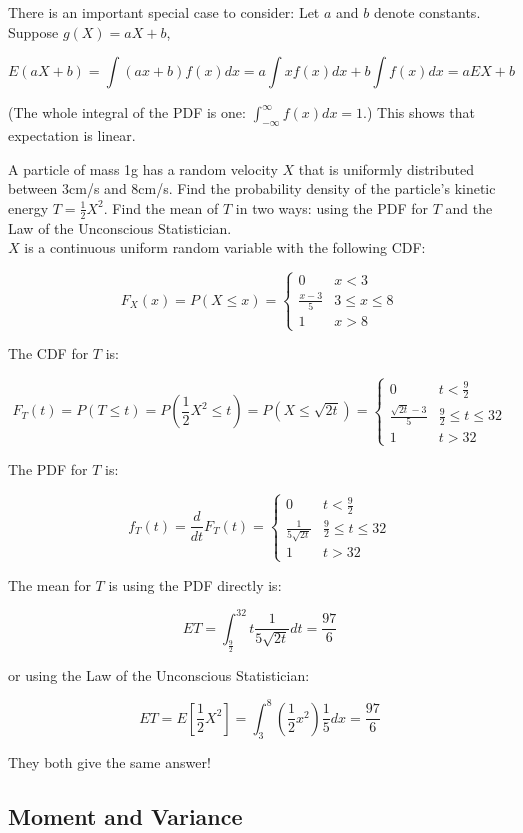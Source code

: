 \documentclass[12pt, a4paper]{article}
\newcounter{exa}
\begin{document}
There is an important special case to consider: Let $a$ and $b$ denote constants. Suppose $g(X)=aX+b$,

\[ E(aX+b)=\int (ax+b)f(x)dx=a\int xf(x)dx+b\int f(x) dx = aEX+b \]

(The whole integral of the PDF is one: $\int_{-\infty}^\infty f(x) dx=1$.) This shows that expectation is linear.

\begin{texample}
A particle of mass 1g has a random velocity $X$ that is uniformly distributed between 3cm/s and 8cm/s. Find the probability density of the particle's kinetic energy $T=\frac12X^2$. Find the mean of $T$ in two ways: using the PDF for $T$ and the Law of the Unconscious Statistician. \\

$X$ is a continuous uniform random variable with the following CDF:

\[F_X(x)=P(X\le x)=\begin{cases} 0 & x<3 \\ \frac{x-3}{5} & 3\le x \le8 \\ 1 & x>8 \end{cases}\]

The CDF for $T$ is:

\[F_T(t)=P(T\le t)=P(\frac12X^2\le t)=P(X\le\sqrt{2t})=\begin{cases} 0 & t<\frac92 \\ \frac{\sqrt{2t}-3}{5} & \frac92\le t \le32 \\ 1 & t>32 \end{cases}\]

The PDF for $T$ is:

\[f_T(t)=\frac{d}{dt}F_T(t)=\begin{cases} 0 & t<\frac92 \\ \frac{1}{5\sqrt{2t}} & \frac92\le t \le32 \\ 1 & t>32 \end{cases}\]

The mean for $T$ is using the PDF directly is:

\[ET=\int_{\frac92}^{32} t\frac{1}{5\sqrt{2t}} dt=\frac{97}{6}\]

or using the Law of the Unconscious Statistician:

\[ET=E[\frac12X^2]=\int_3^8 \left( \frac12x^2 \right)\frac{1}{5}dx=\frac{97}{6}\]

They both give the same answer!
\end{texample}

\subsection{Moment and Variance}
\end{document}
